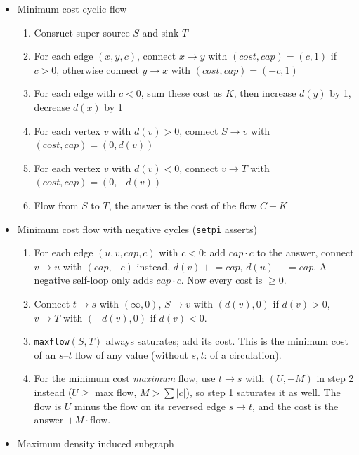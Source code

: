 \begin{itemize}
\begin{enumerate}
    \end{enumerate}
    \item Minimum cost cyclic flow
    \begin{enumerate}
        \item Consruct super source $S$ and sink $T$
        \item For each edge $(x, y, c)$, connect $x \rightarrow y$ with $(cost, cap) = (c, 1)$ if $c > 0$, otherwise connect $y \rightarrow x$ with $(cost, cap) = (-c, 1)$
        \item For each edge with $c < 0$, sum these cost as $K$, then increase $d(y)$ by 1, decrease $d(x)$ by 1
        \item For each vertex $v$ with $d(v) > 0$, connect $S \rightarrow v$ with $(cost, cap) = (0, d(v))$
        \item For each vertex $v$ with $d(v) < 0$, connect $v \rightarrow T$ with $(cost, cap) = (0, -d(v))$
        \item Flow from $S$ to $T$, the answer is the cost of the flow $C + K$
    \end{enumerate}
    \item Minimum cost flow with negative cycles (\texttt{setpi} asserts)
    \begin{enumerate}
      \item For each edge $(u, v, cap, c)$ with $c < 0$: add $cap \cdot c$ to the answer, connect $v \to u$ with $(cap, -c)$ instead, $d(v) \mathrel{+}= cap$, $d(u) \mathrel{-}= cap$. A negative self-loop only adds $cap \cdot c$. Now every cost is $\ge 0$.
      \item Connect $t \to s$ with $(\infty, 0)$, $S \to v$ with $(d(v), 0)$ if $d(v) > 0$, $v \to T$ with $(-d(v), 0)$ if $d(v) < 0$.
      \item \texttt{maxflow}$(S, T)$ always saturates; add its cost. This is the minimum cost of an $s$--$t$ flow of any value (without $s, t$: of a circulation).
      \item For the minimum cost \emph{maximum} flow, use $t \to s$ with $(U, -M)$ in step 2 instead ($U \ge$ max flow, $M > \sum |c|$), so step 1 saturates it as well. The flow is $U$ minus the flow on its reversed edge $s \to t$, and the cost is the answer $+ M \cdot \text{flow}$.
    \end{enumerate}
    \item Maximum density induced subgraph
    \begin{enumerate}

\end{enumerate}
\end{itemize}
